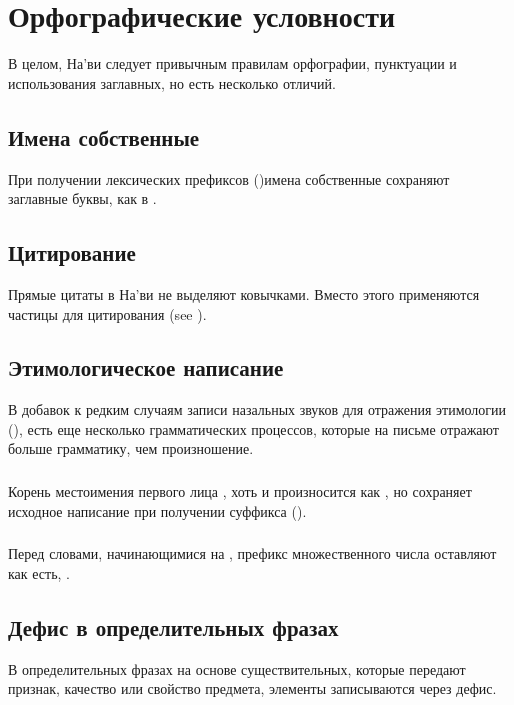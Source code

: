 \section{Орфографические условности}
\noindent В целом, На'ви следует привычным правилам орфографии, пунктуации и использования заглавных, но есть несколько отличий.

\subsection{Имена собственные} При получении лексических префиксов
()имена собственные сохраняют заглавные буквы, как в .

\subsection{Цитирование} Прямые цитаты в На'ви не выделяют ковычками.  Вместо этого применяются частицы для цитирования
 (see ).

\subsection{Этимологическое написание} В добавок к редким случаям записи назальных звуков для отражения этимологии (),
есть еще несколько грамматических процессов, которые на письме отражают больше грамматику, чем произношение.

\subsubsection{} Корень местоимения первого лица , хоть и
произносится как , но сохраняет исходное написание при получении суффикса 
().

\subsubsection{} Перед словами, начинающимися на , префикс множественного числа
 оставляют как есть, .

\subsection{Дефис в определительных фразах} В определительных фразах на основе существительных, которые передают признак, качество или свойство предмета, элементы записываются через дефис.

